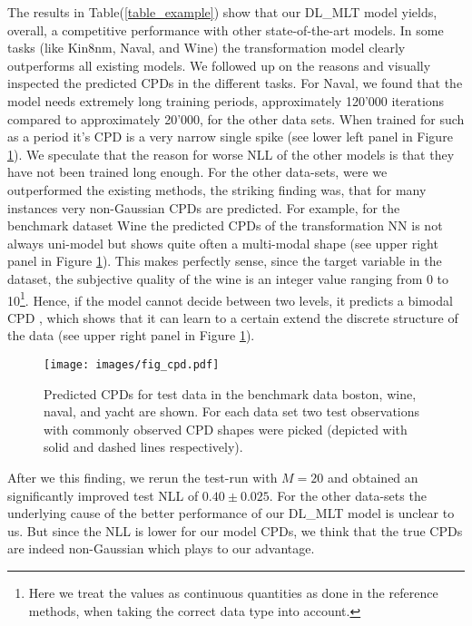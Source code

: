 \documentclass[a4paper,conference]{IEEEtran}
\begin{document}
The results in Table(\ref{table_example}) show that our DL\_MLT model yields, overall, a competitive performance with other state-of-the-art models. In some tasks (like Kin8nm, Naval, and Wine) the transformation model clearly outperforms all existing models. We followed up on the reasons and visually inspected the predicted CPDs in the different tasks. For Naval, we found that the model needs extremely long training periods, approximately 120’000 iterations compared to approximately 20’000, for the other data sets. When trained for such as a period it’s CPD is a very narrow single spike (see lower left panel in Figure \ref{fig:cpdwine}). We speculate that the reason for worse NLL of the other models is that they have not been trained long enough.  For the other data-sets, were we outperformed the existing methods, the striking finding was, that for many instances very non-Gaussian CPDs are predicted. For example, for the benchmark dataset Wine the predicted CPDs of the transformation NN is not always uni-model but shows quite often a multi-modal shape (see upper right panel in Figure \ref{fig:cpdwine}). This makes perfectly sense, since the target variable in the dataset, the subjective quality of the wine is an integer value ranging from 0 to 10\footnote{Here we treat the values as continuous quantities as done in the reference methods, when taking the correct data type into account.}. Hence, if the model cannot decide between two levels, it predicts a bimodal CPD , which shows that it can learn to a certain extend the discrete structure of the data (see upper right panel in Figure \ref{fig:cpdwine}). 

\begin{figure}[h!]
\centering
\texttt{[image: images/fig\_cpd.pdf]}
\caption{Predicted CPDs for test data in the benchmark data boston, wine, naval, and yacht are shown. For each data set two test observations with commonly observed CPD shapes were picked (depicted with solid and dashed lines respectively). }
\label{fig:cpdwine}
\end{figure}

After we this finding, we rerun the test-run with $M=20$ and obtained an significantly improved test NLL of $0.40 \pm 0.025$. For the other data-sets the underlying cause of the better performance of our DL\_MLT model is unclear to us. But since the NLL is lower for our model CPDs, we think that the true CPDs are indeed non-Gaussian which plays to our advantage.
\end{document}
